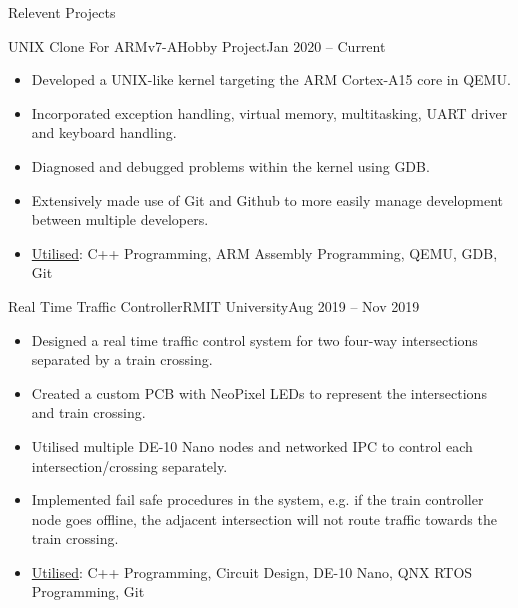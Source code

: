 \documentclass[]{mcdowellcv}
\begin{document}
	\begin{cvsection}{Relevent Projects}
		\begin{cvsubsection}{UNIX Clone For ARMv7-A}{Hobby Project}{Jan 2020 -- Current}
			\begin{itemize}
				\item Developed a UNIX-like kernel targeting the ARM Cortex-A15 core in QEMU.
				\item Incorporated exception handling, virtual memory, multitasking, UART driver and keyboard handling.
				\item Diagnosed and debugged problems within the kernel using GDB.
				\item Extensively made use of Git and Github to more easily manage development between multiple developers.
				\item \underline{Utilised}: C++ Programming, ARM Assembly Programming, QEMU, GDB, Git
			\end{itemize}
		\end{cvsubsection}

		\begin{cvsubsection}{Real Time Traffic Controller}{RMIT University}{Aug 2019 -- Nov 2019}
			\begin{itemize}
				\item Designed a real time traffic control system for two four-way intersections separated by a train crossing.
				\item Created a custom PCB with NeoPixel LEDs to represent the intersections and train crossing.
				\item Utilised multiple DE-10 Nano nodes and networked IPC to control each intersection/crossing separately.
				\item Implemented fail safe procedures in the system, e.g. if the train controller node goes offline, the adjacent intersection will not route traffic towards the train crossing.
				\item \underline{Utilised}: C++ Programming, Circuit Design, DE-10 Nano, QNX RTOS Programming, Git
			\end{itemize}
		\end{cvsubsection}


\end{cvsection}
\end{document}
